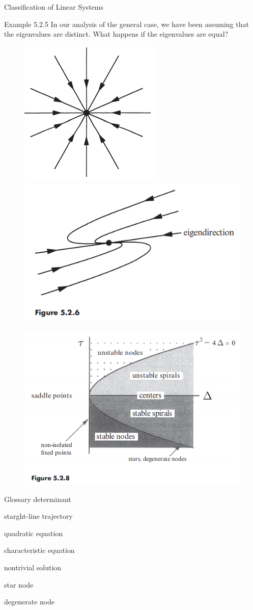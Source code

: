 \documentclass[9pt,aspectratio=43,mathserif,table]{beamer}
\begin{document}
\begin{frame}{Classification of Linear Systems}
  \begin{multicols}{2}
  Example 5.2.5
  In our analysis of the general case, we have been assuming that the eigenvalues are 
  distinct. What happens if the eigenvalues are equal?
    \begin{figure}[!h]
      \centering
      \includegraphics[width=.2\textwidth]{fig/5.2.5.png}
      \includegraphics[width=.2\textwidth]{fig/5.2.6.png}
    \end{figure}
    \begin{figure}[!h]
      \centering
      \includegraphics[width=.5\textwidth]{fig/5.2.8.png}
    \end{figure}
  \end{multicols}
\end{frame}

\begin{frame}{Glossary}
  determinant
  
  starght-line trajectory

  quadratic equation

  characteristic equation

  nontrivial solution

  star node

  degenerate node
\end{frame}
\end{document}
